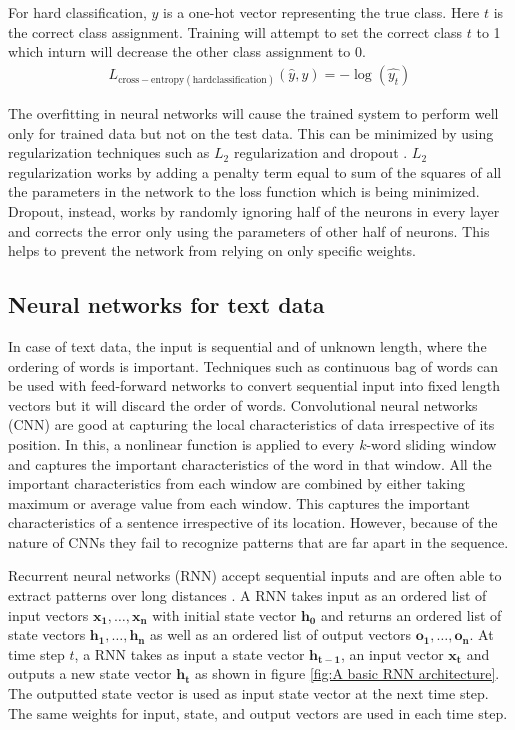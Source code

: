 \documentclass[a4paper, 11pt]{article}
\begin{document}
For hard classification, $y$ is a one-hot vector representing the true class. Here $t$ is the correct class assignment. Training will attempt to set the correct class $t$ to 1 which inturn will decrease the other class assignment to 0.
\begin{align*}
L_{\mathrm{cross-entropy(hard classification)}}(\hat{y},y) = -\log(\hat{y_t})
\end{align*}

The overfitting in neural networks will cause the trained system to perform well only for trained data but not on the test data. This can be minimized by using regularization techniques such as $L_2$ regularization and dropout \parencite{Hinton2012}. $L_2$ regularization works by adding a penalty term equal to sum of the squares of all the parameters in the network to the loss function which is being minimized. Dropout, instead, works by randomly ignoring half of the neurons in every layer and corrects the error only using the parameters of other half of neurons. This helps to prevent the network from relying on only specific weights.

\subsection{Neural networks for text data}

In case of text data, the input is sequential and of unknown length, where the ordering of words is important. Techniques such as continuous bag of words \parencite{DBLP:journals/corr/abs-1301-3781} can be used with feed-forward networks to convert sequential input into fixed length vectors but it will discard the order of words. Convolutional neural networks (CNN) \parencite{Bengio1997} are good at capturing the local characteristics of data irrespective of its position. In this, a nonlinear function is applied to every $k$-word sliding window and captures the important characteristics of the word in that window. All the important characteristics from each window are combined by either taking maximum or average value from each window. This captures the important characteristics of a sentence irrespective of its location. However, because of the nature of CNNs they fail to recognize patterns that are far apart in the sequence.

Recurrent neural networks (RNN) accept sequential inputs and are often able to extract patterns over long distances \parencite{Elman}. A RNN takes input as an ordered list of input vectors $\mathrm{\mathbf{x_1},\dots,\mathbf{x_n}}$ with initial state vector $\mathbf{h_0}$ and returns an ordered list of state vectors $\mathrm{\mathbf{h_1},\dots,\mathbf{h_n}}$ as well as an ordered list of output vectors $\mathrm{\mathbf{o_1},\dots,\mathbf{o_n}}$. At time step $t$, a RNN takes as input a state vector $\mathbf{h_{t-1}}$, an input vector $\mathbf{x_{t}}$ and outputs a new state vector $\mathbf{h_{t}}$ as shown in figure \ref{fig:A basic RNN architecture}. The outputted state vector is used as input state vector at the next time step. The same weights for input, state, and output vectors are used in each time step.  
\end{document}
